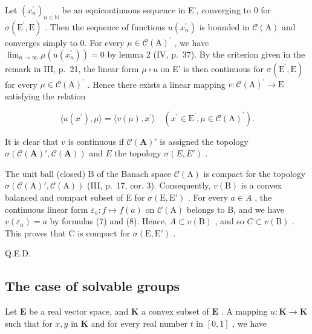 Let \((x_{n}^{\prime})_{n\in\mathbb{N}}\) be an equicontinuous sequence in E', converging to 0 for \(\sigma(\mathrm{E}^{\prime},\mathrm{E})\) . Then the sequence of functions \(u(x_{n}^{\prime})\) is bounded in \(\mathcal{C}(\mathrm{A})\) and converges simply to 0. For every \(\mu\in\mathcal{C}(\mathrm{A})^{\prime}\) , we have \(\lim_{n\to\infty}\mu(u(x_{n}^{\prime}))=0\) by lemma 2 (IV, p.~37). By the criterion given in the remark in III, p.~21, the linear form \(\mu\circ u\) on E' is then continuous for \(\sigma(\mathrm{E}^{\prime},\mathrm{E})\) for every \(\mu\in\mathcal{C}(\mathrm{A})^{\prime}\) . Hence there exists a linear mapping \(v:\mathcal{C}(\mathrm{A})^{\prime}\to\mathrm{E}\) satisfying the relation

\[
\langle u (x ^ {\prime}), \mu \rangle = \langle v (\mu), x ^ {\prime} \rangle \quad \left(x ^ {\prime} \in \mathrm{E} ^ {\prime}, \mu \in \mathcal {C} (\mathrm{A}) ^ {\prime}\right).\tag{8}
\]

It is clear that \(v\) is continuous if \(\mathcal{C}(\mathbf{A})'\) is assigned the topology \(\sigma(\mathcal{C}(\mathbf{A})', \mathcal{C}(\mathbf{A}))\) and \(E\) the topology \(\sigma(E, E')\) .

The unit ball (closed) B of the Banach space \(\mathcal{C}(\mathrm{A})\) is compact for the topology \(\sigma(\mathcal{C}(\mathrm{A})', \mathcal{C}(\mathrm{A}))\) (III, p.~17, cor. 3). Consequently, \(v(\mathrm{B})\) is a convex balanced and compact subset of E for \(\sigma(\mathrm{E}, \mathrm{E}')\) . For every \(a \in A\) , the continuous linear form \(\varepsilon_a : f \mapsto f(a)\) on \(\mathcal{C}(\mathrm{A})\) belongs to B, and we have \(v(\varepsilon_a) = a\) by formulas (7) and (8). Hence, \(A \subset v(\mathrm{B})\) , and so \(C \subset v(\mathrm{B})\) . This proves that C is compact for \(\sigma(\mathrm{E}, \mathrm{E}')\) .

Q.E.D.


\subsection{The case of solvable groups}

Let \(\mathbf{E}\) be a real vector space, and \(\mathbf{K}\) a convex subset of \(\mathbf{E}\) . A mapping \(u: \mathbf{K} \to \mathbf{K}\) such that for \(x, y\) in \(\mathbf{K}\) and for every real number \(t\) in \([0, 1]\) , we have

